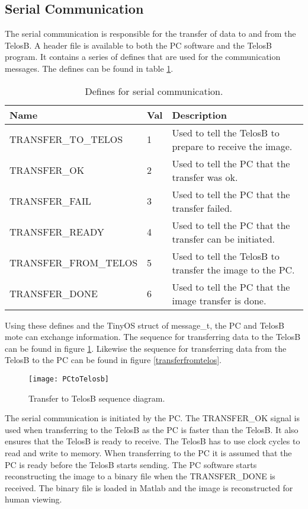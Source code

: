 \subsection{Serial Communication}
The serial communication is responsible for the transfer of data to and from the TelosB. A header file is available to both the PC software and the TelosB program. It contains a series of defines that are used for the communication messages. The defines can be found in table \ref{definetable}.
\begin{table}[H]
\centering
    \begin{tabular}{|l|l|l|}
    \hline
    Name                  & Val & Description                                               \\ \hline
    TRANSFER\_TO\_TELOS   & 1     & Used to tell the TelosB to prepare to receive the image. \\ \hline
    TRANSFER\_OK          & 2     & Used to tell the PC that the transfer was ok.             \\ \hline
    TRANSFER\_FAIL        & 3     & Used to tell the PC that the transfer failed.             \\ \hline
    TRANSFER\_READY       & 4     & Used to tell the PC that the transfer can be initiated.   \\ \hline
    TRANSFER\_FROM\_TELOS & 5     & Used to tell the TelosB to transfer the image to the PC.  \\ \hline
    TRANSFER\_DONE        & 6     & Used to tell the PC that the image transfer is done.      \\ \hline
    \end{tabular}
    \caption{Defines for serial communication.}
    \label{definetable}
\end{table}
Using these defines and the TinyOS struct of message\_t, the PC and TelosB mote can exchange information. The sequence for transferring data to the TelosB can be found in figure \ref{transfertotelos}. Likewise the sequence for transferring data from the TelosB to the PC can be found in figure \ref{transferfromtelos}.
\begin{figure}[H]
	\centering
	\texttt{[image: PCtoTelosb]}
	\caption{Transfer to TelosB sequence diagram.}
	\label{transfertotelos}
\end{figure}
The serial communication is initiated by the PC. The TRANSFER\_OK signal is used when transferring to the TelosB as the PC is faster than the TelosB. It also ensures that the TelosB is ready to receive. The TelosB has to use clock cycles to read and write to memory. When transferring to the PC it is assumed that the PC is ready before the TelosB starts sending. The PC software starts reconstructing the image to a binary file when the TRANSFER\_DONE is received. The binary file is loaded in Matlab and the image is reconstructed for human viewing.
